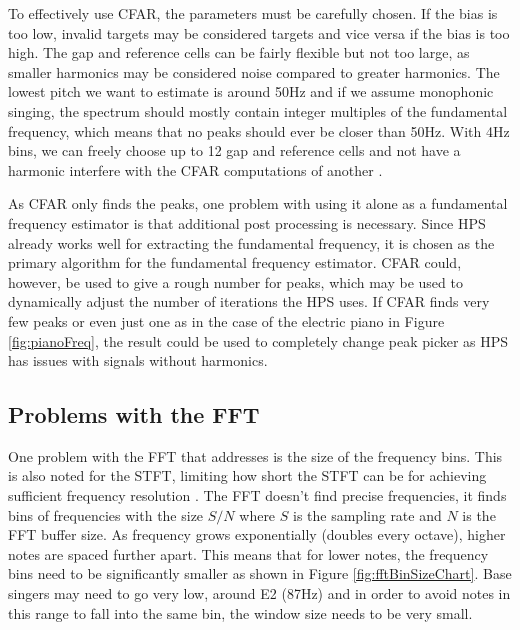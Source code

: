 To effectively use CFAR, the parameters must be carefully chosen. If the bias is too low, invalid targets may be considered targets and vice versa if the bias is too high. The gap and reference cells can be fairly flexible but not too large, as smaller harmonics may be considered noise compared to greater harmonics. The lowest pitch we want to estimate is around 50Hz and if we assume monophonic singing, the spectrum should mostly contain integer multiples of the fundamental frequency, which means that no peaks should ever be closer than 50Hz. With 4Hz bins, we can freely choose up to 12 gap and reference cells and not have a harmonic interfere with the CFAR computations of another \cite{Bruner2024}.  

As CFAR only finds the peaks, one problem with using it alone as a fundamental frequency estimator is that additional post processing is necessary. Since HPS already works well for extracting the fundamental frequency, it is chosen as the primary algorithm for the fundamental frequency estimator. CFAR could, however, be used to give a rough number for peaks, which may be used to dynamically adjust the number of iterations the HPS uses. If CFAR finds very few peaks or even just one as in the case of the electric piano in Figure \ref{fig:pianoFreq}, the result could be used to completely change peak picker as HPS has issues with signals without harmonics.

\subsection{Problems with the FFT}
One problem with the FFT that \cite{Gotsopoulos} addresses is the size of the frequency bins. This is also noted for the STFT, limiting how short the STFT can be for achieving sufficient frequency resolution \cite{Evans2012}. The FFT doesn't find precise frequencies, it finds bins of frequencies with the size $S/N$ where $S$ is the sampling rate and $N$ is the FFT buffer size. As frequency grows exponentially (doubles every octave), higher notes are spaced further apart. This means that for lower notes, the frequency bins need to be significantly smaller as shown in Figure \ref{fig:fftBinSizeChart}. Base singers may need to go very low, around E2 (87Hz) and in order to avoid notes in this range to fall into the same bin, the window size needs to be very small.  

